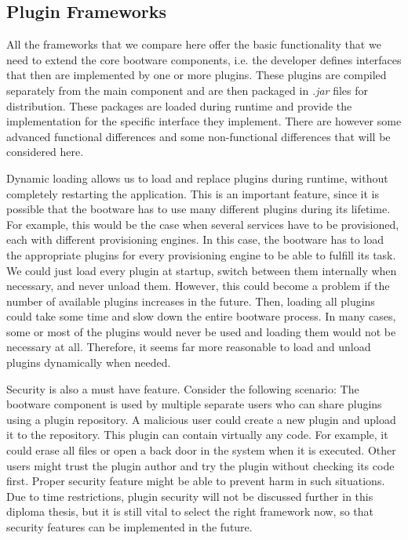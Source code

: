 \subsection{Plugin Frameworks}
\label{implementation:selecting:pluginframeworks}

All the frameworks that we compare here offer the basic functionality that we need to extend the core bootware components, i.e. the developer defines interfaces that then are implemented by one or more plugins.
These plugins are compiled separately from the main component and are then packaged in \textit{.jar} files for distribution.
These packages are loaded during runtime and provide the implementation for the specific interface they implement.
There are however some advanced functional differences and some non-functional differences that will be considered here.

Dynamic loading allows us to load and replace plugins during runtime, without completely restarting the application.
This is an important feature, since it is possible that the bootware has to use many different plugins during its lifetime.
For example, this would be the case when several services have to be provisioned, each with different provisioning engines.
In this case, the bootware has to load the appropriate plugins for every provisioning engine to be able to fulfill its task.
We could just load every plugin at startup, switch between them internally when necessary, and never unload them.
However, this could become a problem if the number of available plugins increases in the future.
Then, loading all plugins could take some time and slow down the entire bootware process.
In many cases, some or most of the plugins would never be used and loading them would not be necessary at all.
Therefore, it seems far more reasonable to load and unload plugins dynamically when needed.

Security is also a must have feature.
Consider the following scenario: The bootware component is used by multiple separate users who can share plugins using a plugin repository.
A malicious user could create a new plugin and upload it to the repository.
This plugin can contain virtually any code.
For example, it could erase all files or open a back door in the system when it is executed.
Other users might trust the plugin author and try the plugin without checking its code first.
Proper security feature might be able to prevent harm in such situations.
Due to time restrictions, plugin security will not be discussed further in this diploma thesis, but it is still vital to select the right framework now, so that security features can be implemented in the future.

